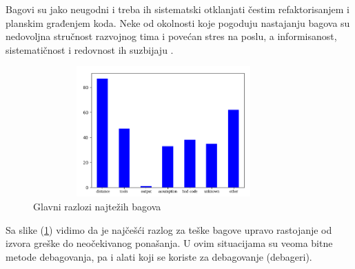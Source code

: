 \documentclass[a4paper]{article}
\begin{document}
Bagovi su jako neugodni i treba ih sistematski otklanjati čestim refaktorisanjem i planskim građenjem koda. Neke od okolnosti koje pogoduju nastajanju bagova su nedovoljna stručnost razvojnog tima i povećan stres na poslu, a informisanost, sistematičnost i redovnost ih suzbijaju .

\begin{figure}[h!]
	\begin{center}
		\includegraphics[width=100mm,height=50mm]{Slike/bagovi.png}
	\end{center}
	\caption{Glavni razlozi najtežih bagova \cite{study_bugs}}
	\label{fig:bagovi}
\end{figure}
\cite{bagovi_smalkov}
Sa slike (\ref{fig:bagovi}) vidimo da je najčešći razlog za teške bagove upravo rastojanje od izvora greške do neočekivanog ponašanja. U ovim situacijama su veoma bitne metode debagovanja, pa i alati koji se koriste za debagovanje (debageri).
\end{document}
